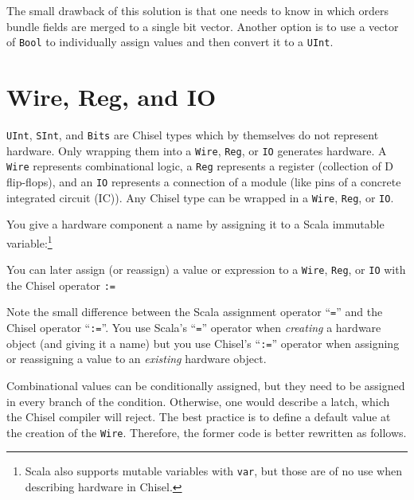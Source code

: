 \documentclass[%
    10pt,
    headinclude, footexclude,
    openright, %
    notitlepage,
    cleardoubleempty,
    headsepline,
    pointlessnumbers,
    bibtotoc, idxtotoc,
    ]{scrbook}
\newcommand{\code}[1]{{\lstinline[basicstyle=\small\ttfamily]{#1}}}
\newcommand{\codefoot}[1]{{\lstinline[basicstyle=\footnotesize\ttfamily]{#1}}}
\begin{document}

\noindent The small drawback of this solution is that one needs to know in which orders
bundle fields are merged to a single bit vector. Another option is to use a vector of \code{Bool}
to individually assign values and then convert it to a \code{UInt}.


\section{Wire, Reg, and IO}

\code{UInt}, \code{SInt}, and \code{Bits} are Chisel types which by themselves do not
represent hardware. Only wrapping them into a \code{Wire}, \code{Reg}, or \code{IO}
generates hardware. A \code{Wire} represents combinational logic, a \code{Reg}
represents a register (collection of D flip-flops), and an \code{IO} represents a
connection of a module (like pins of a concrete integrated circuit (IC)).
Any Chisel type can be wrapped in a \code{Wire}, \code{Reg}, or \code{IO}.

You give a hardware component a name by assigning it to a Scala immutable
variable:\footnote{Scala also supports mutable variables with \codefoot{var}, but those are of no use
when describing hardware in Chisel.}


\noindent You can later assign (or reassign) a value or expression to a \code{Wire}, \code{Reg}, or \code{IO}
with the Chisel operator \code{:=}


\noindent Note the small difference between the Scala assignment operator ``\code{=}''
and the Chisel operator ``\code{:=}''. You use Scala's ``\code{=}'' operator when \emph{creating} a hardware
object (and giving it a name) but you use Chisel's ``\code{:=}'' operator when assigning or reassigning a value to
an \emph{existing} hardware object.

Combinational values can be conditionally assigned, but they need to be assigned in every branch
of the condition. Otherwise, one would describe a latch, which the Chisel compiler will reject.
The best practice is to define a default value at the creation of the \code{Wire}.
Therefore, the former code is better rewritten as follows.
\end{document}

